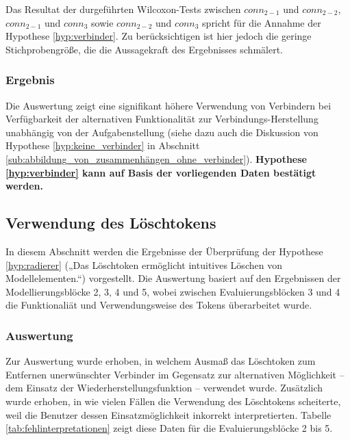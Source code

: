 Das Resultat der durgeführten Wilcoxon-Tests zwischen $conn_{2-1}$ und $conn_{2-2}$, $conn_{2-1}$ und $conn_{3}$ sowie $conn_{2-2}$ und $conn_{3}$ spricht für die Annahme der Hypothese \ref{hyp:verbinder}. Zu berücksichtigen ist hier jedoch die geringe Stichprobengröße, die die Aussagekraft des Ergebnisses schmälert.

\subsubsection{Ergebnis} %

Die Auswertung zeigt eine signifikant höhere Verwendung von Verbindern bei Verfügbarkeit der alternativen Funktionalität zur Verbindungs-Herstellung unabhängig von der Aufgabenstellung (siehe dazu auch die Diskussion von Hypothese \ref{hyp:keine_verbinder} in Abschnitt \ref{sub:abbildung_von_zusammenhängen_ohne_verbinder}). \textbf{Hypothese \ref{hyp:verbinder} kann auf Basis der vorliegenden Daten bestätigt werden.}


\subsection{Verwendung des Löschtokens} %
\label{sub:verwendung_des_löschtokens}

In diesem Abschnitt werden die Ergebnisse der Überprüfung der Hypothese \ref{hyp:radierer} („Das Löschtoken ermöglicht intuitives Löschen von Modellelementen.“) vorgestellt. Die Auswertung basiert auf den Ergebnissen der Modellierungsblöcke 2, 3, 4 und 5, wobei zwischen Evaluierungsblöcken 3 und 4 die Funktionaliät und Verwendungsweise des Tokens überarbeitet wurde.

\subsubsection{Auswertung} %

Zur Auswertung wurde erhoben, in welchem Ausmaß das Löschtoken zum Entfernen unerwünschter Verbinder im Gegensatz zur alternativen Möglichkeit -- dem Einsatz der Wiederherstellungsfunktion -- verwendet wurde. Zusätzlich wurde erhoben, in wie vielen Fällen die Verwendung des Löschtokens scheiterte, weil die Benutzer dessen Einsatzmöglichkeit inkorrekt interpretierten. Tabelle \ref{tab:fehlinterpretationen} zeigt diese Daten für die Evaluierungsblöcke 2 bis 5.

